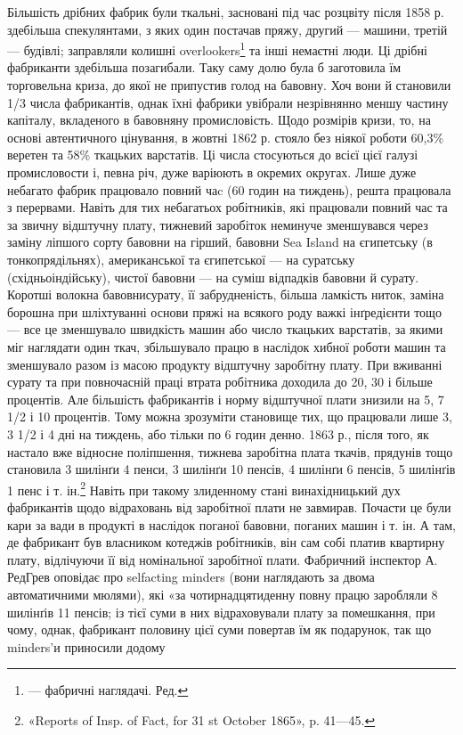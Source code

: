 \parcont{}  %
Більшість дрібних фабрик були ткальні, засновані під час розцвіту
після 1858 р. здебільша спекулянтами, з яких один постачав
пряжу, другий — машини, третій — будівлі; заправляли колишні
overlookers\footnote*{
— фабричні наглядачі. Ред.
} та інші немаєтні люди. Ці дрібні фабриканти здебільша
позагибали. Таку саму долю була б заготовила їм торговельна
криза, до якої не припустив голод на бавовну. Хоч вони
й становили 1/3 числа фабрикантів, однак їхні фабрики увібрали
незрівнянно меншу частину капіталу, вкладеного в бавовняну промисловість.
Щодо розмірів кризи, то, на основі автентичного
цінування, в жовтні 1862 р. стояло без ніякої роботи 60,3\%
веретен та 58\% ткацьких варстатів. Ці числа стосуються до всієї
цієї галузі промисловости і, певна річ, дуже варіюють в окремих
округах. Лише дуже небагато фабрик працювало повний чаc (60 годин на тиждень), решта працювала з
перервами. Навіть
для тих небагатьох робітників, які працювали повний час
та за звичну відштучну плату, тижневий заробіток неминуче зменшувався
через заміну ліпшого сорту бавовни на гірший, бавовни
Sea Island на єгипетську (в тонкопрядільнях), американської та
єгипетської — на суратську (східньоіндійську), чистої бавовни —
на суміш відпадків бавовни й сурату. Коротші волокна бавовнисурату,
її забрудненість, більша ламкість ниток, заміна борошна
при шліхтуванні основи пряжі на всякого роду важкі інґредієнти
тощо — все це зменшувало швидкість машин або число ткацьких
варстатів, за якими міг наглядати один ткач, збільшувало працю
в наслідок хибної роботи машин та зменшувало разом із масою
продукту відштучну заробітну плату. При вживанні сурату та
при повночасній праці втрата робітника доходила до 20, 30 і
більше процентів. Але більшість фабрикантів і норму відштучної
плати знизили на 5, 7 1/2 і 10 процентів. Тому можна зрозуміти
становище тих, що працювали лише 3, 3 1/2 і 4 дні на тиждень,
або тільки по 6 годин денно. 1863 р., після того, як настало вже
відносне поліпшення, тижнева заробітна плата ткачів, прядунів
тощо становила 3 шилінґи 4 пенси, 3 шилінґи 10 пенсів, 4 шилінґи
6 пенсів, 5 шилінґів 1 пенс і т. ін.\footnote{
«Reports of Insp. of Fact, for 31 st October 1865», p. 41—45.
} Навіть при такому злиденному
стані винахідницький дух фабрикантів щодо відраховань
від заробітної плати не завмирав. Почасти це були кари за вади
в продукті в наслідок поганої бавовни, поганих машин і т. ін.
А там, де фабрикант був власником котеджів робітників, він сам
собі платив квартирну плату, відлічуючи її від номінальної
заробітної плати. Фабричний інспектор А. РедГрев оповідає
про selfacting minders (вони наглядають за двома автоматичними
мюлями), які «за чотирнадцятиденну повну працю заробляли
8 шилінґів 11 пенсів; із тієї суми в них відраховували плату за
помешкання, при чому, однак, фабрикант половину цієї суми
повертав їм як подарунок, так що minders’и приносили додому
\parbreak{}  %
